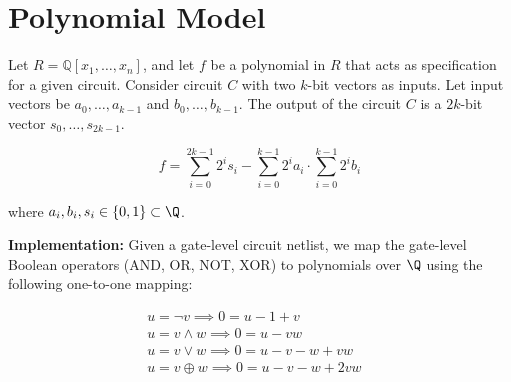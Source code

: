\section{Polynomial Model}

Let $R = \mathbb{Q}[x_1,\dots,x_n]$, and let $f$ be a polynomial in $R$ that acts as specification for a given circuit. Consider circuit $C$ with two $k$-bit vectors as inputs. Let input vectors be $a_0,\dots,a_{k-1}$ and $b_0,\dots,b_{k-1}$. The output of the circuit $C$ is a $2k$-bit vector $s_0,\dots,s_{2k-1}$.
\vspace{-7mm}
\small{
\begin{center}
    \begin{equation}
        f = \sum_{i=0}^{2k-1} 2^is_i-\sum_{i=0}^{k-1} 2^ia_i\cdot \sum_{i=0}^{k-1} 2^ib_i
    \end{equation}
\end{center}
}
where $a_i,b_i,s_i \in \{0,1\} \subset \Q$.

\textbf{Implementation:} Given a gate-level circuit netlist, we map the gate-level Boolean
operators (AND, OR, NOT, XOR) to polynomials over $\Q$ using the following one-to-one mapping:

\begin{equation}
\begin{split}
u = \neg v \implies 0 = u - 1 + v & \\
u = v \land w \implies 0 = u - vw & \\
u = v \lor w \implies 0 = u - v - w + vw & \\
u = v \oplus w \implies 0 = u - v - w + 2vw &
\end{split}
\label{eq: gates}
\end{equation}

